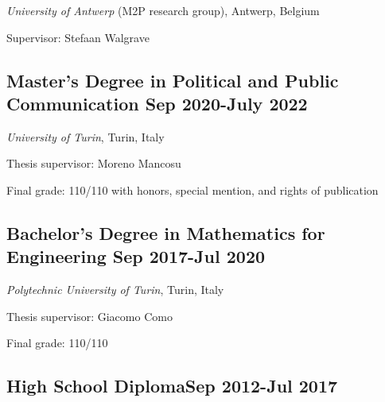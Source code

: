 \documentclass[8pt,]{article}
\providecommand{\tightlist}{%
  \setlength{\itemsep}{0pt}\setlength{\parskip}{0pt}}
\renewenvironment{itemize}{
  \begin{list}{}{
    \setlength{\leftmargin}{1.5em}
  }
}{
  \end{list}
}
\begin{document}
\begin{itemize}
\tightlist
\item
  \emph{University of Antwerp} (M2P research group), Antwerp, Belgium
\item
  Supervisor: Stefaan Walgrave
\end{itemize}

\hypertarget{masters-degree-in-political-and-public-communication-sep-2020-july-2022}{%
\subsection{\texorpdfstring{Master's Degree in Political and Public
Communication \hfill Sep 2020-July
2022}{Master's Degree in Political and Public Communication Sep 2020-July 2022}}\label{masters-degree-in-political-and-public-communication-sep-2020-july-2022}}

\begin{itemize}
\tightlist
\item
  \emph{University of Turin}, Turin, Italy
\item
  Thesis supervisor: Moreno Mancosu
\item
  Final grade: 110/110 with honors, special mention, and rights of
  publication
\end{itemize}

\hypertarget{bachelors-degree-in-mathematics-for-engineering-sep-2017-jul-2020}{%
\subsection{\texorpdfstring{Bachelor's Degree in Mathematics for
Engineering \hfill Sep 2017-Jul
2020}{Bachelor's Degree in Mathematics for Engineering Sep 2017-Jul 2020}}\label{bachelors-degree-in-mathematics-for-engineering-sep-2017-jul-2020}}

\begin{itemize}
\tightlist
\item
  \emph{Polytechnic University of Turin}, Turin, Italy
\item
  Thesis supervisor: Giacomo Como
\item
  Final grade: 110/110
\end{itemize}

\hypertarget{high-school-diplomasep-2012-jul-2017}{%
\subsection{\texorpdfstring{High School Diploma\hfill Sep 2012-Jul
2017}{High School DiplomaSep 2012-Jul 2017}}\label{high-school-diplomasep-2012-jul-2017}}
\end{document}
